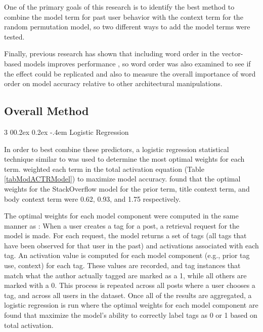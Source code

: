 \documentclass[man,floatsintext,donotrepeattitle]{apa6}
\makeatletter
\renewcommand{\subsubsection}{%
  \@startsection
  {subsubsection}%
  {3}%
  {\parindent}%
  {0\baselineskip \@plus 0.2ex \@minus 0.2ex}%
  {-.4em}%
  {\normalfont\normalsize\bfseries\addperi}}
\makeatother
\begin{document}
One of the primary goals of this research is to identify the best method to combine the model term for past user behavior with the context term for the random permutation model,
so two different ways to add the model terms were tested.

Finally, previous research has shown that including word order in the vector-based models improves performance \parencites{Jones2007, Sahlgren2008},
so word order was also examined to see if the effect could be replicated and also to measure the overall importance of word order on model accuracy relative to other architectural manipulations.

\subsection{Overall Method}

\subsubsection{Logistic Regression}

In order to best combine these predictors, a logistic regression statistical technique similar to \textcite{Stanley2013} was used to determine the most optimal weights for each term.
\textcite{Stanley2013} weighted each term in the total activation equation (Table \ref{tabModACTRModel}) to maximize model accuracy.
\citeauthor{Stanley2013} found that the optimal weights for the StackOverflow model for the prior term, title context term, and body context term were \num{.62}, \num{.93}, and \num{1.75} respectively.

The optimal weights for each model component were computed in the same manner as \textcite{Stanley2013}:
When a user creates a tag for a post, a retrieval request for the model is made.
For each request, the model returns a set of tags (all tags that have been observed for that user in the past) and activations associated with each tag.
An activation value is computed for each model component (e.g., prior tag use, context) for each tag.
These values are recorded, and tag instances that match what the author actually tagged are marked as a 1, while all others are marked with a 0.
This process is repeated across all posts where a user chooses a tag, and across all users in the dataset.
Once all of the results are aggregated, a logistic regression is run where the optimal weights for each model component are found that maximize the model's ability to correctly label tags as 0 or 1 based on total activation.
\end{document}
